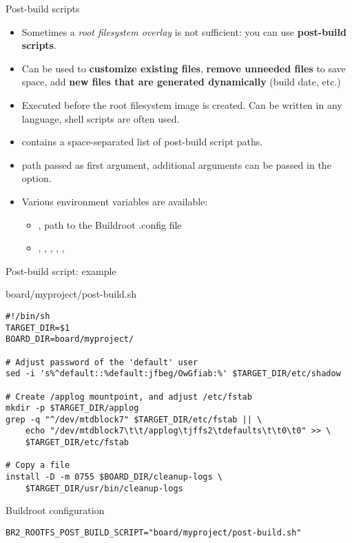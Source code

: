 \begin{frame}{Post-build scripts}
  \begin{itemize}
  \item Sometimes a {\em root filesystem overlay} is not sufficient:
    you can use {\bf post-build scripts}.
  \item Can be used to {\bf customize existing files}, {\bf remove
      unneeded files} to save space, add {\bf new files that are
      generated dynamically} (build date, etc.)
  \item Executed before the root filesystem image is created. Can be
    written in any language, shell scripts are often used.
  \item {} contains a space-separated
    list of post-build script paths.
  \item {} path passed as first argument, additional
    arguments can be passed in the 
    option.
  \item Various environment variables are available:
    \begin{itemize}
      \item {}, path to the Buildroot .config file
      \item {}, , ,
        , , 
      \end{itemize}
  \end{itemize}
\end{frame}

\begin{frame}[fragile]{Post-build script: example}

\begin{block}{board/myproject/post-build.sh}
\begin{verbatim}
#!/bin/sh
TARGET_DIR=$1
BOARD_DIR=board/myproject/

# Adjust password of the 'default' user
sed -i 's%^default::%default:jfbeg/OwGfiab:%' $TARGET_DIR/etc/shadow

# Create /applog mountpoint, and adjust /etc/fstab
mkdir -p $TARGET_DIR/applog
grep -q "^/dev/mtdblock7" $TARGET_DIR/etc/fstab || \
    echo "/dev/mtdblock7\t\t/applog\tjffs2\tdefaults\t\t0\t0" >> \
    $TARGET_DIR/etc/fstab

# Copy a file
install -D -m 0755 $BOARD_DIR/cleanup-logs \
    $TARGET_DIR/usr/bin/cleanup-logs
\end{verbatim}
\end{block}

\begin{block}{Buildroot configuration}
{\scriptsize
\begin{verbatim}
BR2_ROOTFS_POST_BUILD_SCRIPT="board/myproject/post-build.sh"
\end{verbatim}}
\end{block}

\end{frame}

